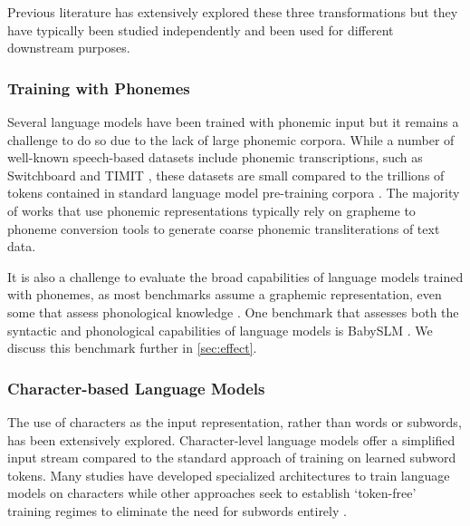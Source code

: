Previous literature has extensively explored these three transformations but they have typically been studied independently and been used for different downstream purposes. 

\subsubsection{Training with Phonemes}

Several language models have been trained with phonemic input \citep{sundararaman-2021-phonemebert, gale-etal-2023-bort} but it remains a challenge to do so due to the lack of large phonemic corpora. While a number of well-known speech-based datasets include phonemic transcriptions, such as Switchboard \citep{godfrey-1992-switchboard} and TIMIT \citep{garofolo-1993-timit}, these datasets are small compared to the trillions of tokens contained in standard language model pre-training corpora \citep{elazar-2024-redpajama}. The majority of works that use phonemic representations typically rely on grapheme to phoneme conversion tools \citep{bisani-2008-g2p, hasegawa-2020-g2pmultilingual} to generate coarse phonemic transliterations of text data.

It is also a challenge to evaluate the broad capabilities of language models trained with phonemes, as most benchmarks assume a graphemic representation, even some that assess phonological knowledge \citep{suvarna-etal-2024-phonologybench}. One benchmark that assesses both the syntactic and phonological capabilities of language models is BabySLM \citep{lavechin}. %
We discuss this benchmark further in \cref{sec:effect}.

\subsubsection{Character-based Language Models}

The use of characters as the input representation, rather than words or subwords, has been extensively explored. Character-level language models offer a simplified input stream compared to the standard approach of training on learned subword tokens. Many studies have developed specialized architectures to train language models on characters \citep{jozefowicz2016exploringlimitslanguagemodeling, kim2016character, ma-etal-2020-charbert, al-rfou_character-level_2019} while other approaches seek to establish `token-free' training regimes to eliminate the need for subwords entirely \citep{clark-etal-2022-canine, xue-etal-2022-byt5}.


